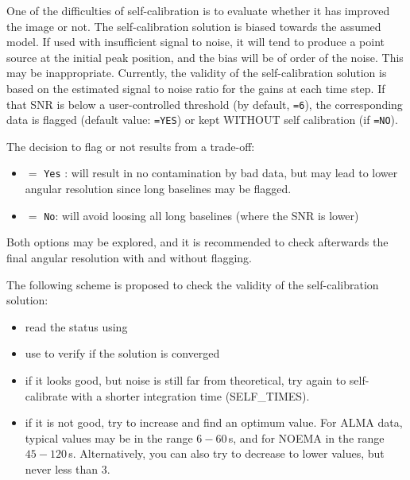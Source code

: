 \begin{description}\itemsep 0pt
\item [Validation of the solution] 
One of the difficulties of self-calibration is to evaluate whether
it has improved the image or not. The self-calibration 
solution is biased towards the assumed model. If used with insufficient
signal to noise, it will tend to produce a point source at the
initial peak position, and the bias will be of order of the noise.
This may be inappropriate. 
Currently, the validity of the self-calibration solution is based on 
the estimated signal to noise ratio for the gains at each time step. 
If that SNR is below a user-controlled threshold (by default, \texttt{=6}), 
the corresponding data is flagged (default value: \texttt{=YES}) 
or kept WITHOUT self calibration (if \texttt{=NO}). 
%
\item [Flagging or not flagging ?] 
The decision to flag or not results from a trade-off:
\begin{itemize}\itemsep 0pt
\item {} $=$ \texttt{Yes} : will result in no contamination by bad data, but
may lead to lower angular resolution since long baselines may be flagged.
\item {} $=$ \texttt{No}: will avoid loosing all long baselines (where the SNR is lower)
\end{itemize}
Both options may be explored, and it is recommended to check afterwards the final angular 
resolution with and without flagging.
\end{description}

The following scheme is proposed to check the validity of the self-calibration solution:
\begin{itemize}\itemsep 0pt
\item read the status using 
\item use  to verify if the solution is converged
\item if it looks good, but noise is still far from theoretical, try 
again to self-calibrate with a shorter integration time (SELF\_TIMES). 
\item if it is not good, try to increase  and find an 
optimum value. For ALMA data, typical values may be in the range 
$6-60$\,s, and for NOEMA in the range $45-120$\,s. Alternatively, you 
can also try to decrease  to lower values, but never
less than 3.
\end{itemize}

